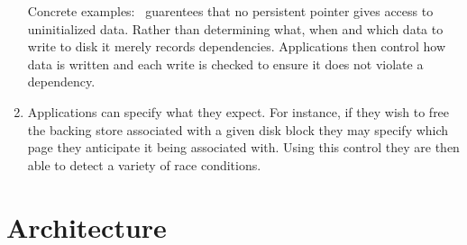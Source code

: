 \begin{enumerate}
	Concrete examples: \xxx\ guarentees that no persistent pointer
	gives access to uninitialized data.  Rather than determining
	what, when and which data to write to disk it merely records
	dependencies.  Applications then control how data is written
	and each write is checked to ensure it does not violate a 
	dependency.

	\item Applications can specify what they expect.  For instance,
	if they wish to free the backing store associated with a given
	disk block they may specify which page they anticipate it being
	associated with.  Using this control they are then able to 
	detect a variety of race conditions.
\end{enumerate}

\section{Architecture}

